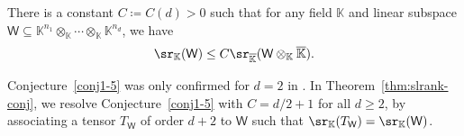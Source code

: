 \begin{conjecture}\cite[Conjecture~1.16]{adiprasito2021schmidt}\label{conj1-5}
There is a constant $C \coloneqq C (d)>0$ such that for any field $\mathbb{K}$ and linear subspace $\mathsf{W} \subseteq \mathbb{K}^{n_1} \otimes_{\mathbb{K}} \cdots \otimes_{\mathbb{K}} \mathbb{K}^{n_d}$,  we have 
\[
\sr_{\mathbb{K}}(\mathsf{W})\le C\sr_{\overline{\mathbb{K}}}(\mathsf{W} \otimes_{\mathbb{K}} \overline{\mathbb{K}}).
\]
\end{conjecture}
Conjecture~\ref{conj1-5} was only confirmed for $d = 2$ in \cite[Theorem~1.17]{adiprasito2021schmidt}.  In Theorem~\ref{thm:slrank-conj},  we resolve Conjecture~\ref{conj1-5} with $C = d/2 + 1$ for all $d \ge 2$,  by associating a tensor $T_{\mathsf{W}}$ of order $d+2$ to $\mathsf{W}$ such that $\sr_{\mathbb{K}}(T_\mathsf{W}) = \sr_{\mathbb{K}}(\mathsf{W})$. 
